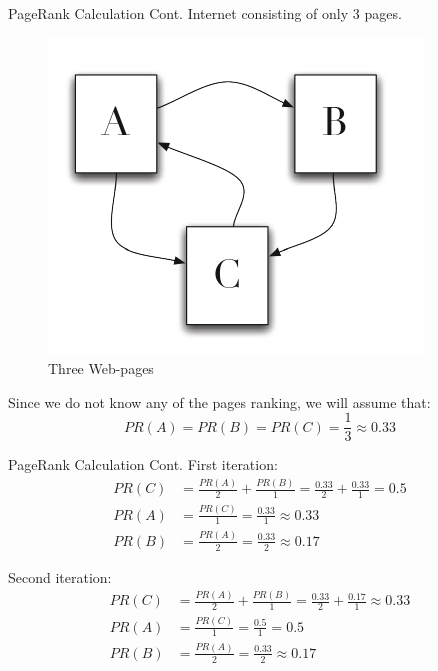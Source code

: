 \documentclass[10pt]{beamer}
\begin{document}
{
\begin{frame}{PageRank Calculation Cont.}
    Internet consisting of only 3 pages. 
  \begin{figure}
		\includegraphics[scale=0.5]{images/Figure1.pdf}
        \caption{Three Web-pages}\label{fig:three-pages}
   \end{figure}
  Since we do not know any of the pages ranking, we will assume that:  
	\begin{equation*}
    	PR(A) = PR(B) = PR(C) = \frac{1}{3} \approx 0.33
	\end{equation*}
\end{frame}

\begin{frame}{PageRank Calculation Cont.}
First iteration:
 	\begin{align*}
    		PR(C) &=\frac{PR(A)}{2}  + \frac{PR(B)}{1}  = \frac{0.33}{2} + \frac{0.33}{1} = 0.5\\
            PR(A) &=\frac{PR(C)}{1}  = \frac{0.33}{1} \approx 0.33\\
            PR(B) &=\frac{PR(A)}{2}  = \frac{0.33}{2} \approx 0.17
	\end{align*}
    
Second iteration:
 	\begin{align*}
    		PR(C) &=\frac{PR(A)}{2}  + \frac{PR(B)}{1}  = \frac{0.33}{2} + \frac{0.17}{1} \approx 0.33\\
            PR(A) &=\frac{PR(C)}{1}  = \frac{0.5}{1} = 0.5\\
            PR(B) &=\frac{PR(A)}{2}  = \frac{0.33}{2} \approx 0.17
	\end{align*}
\end{frame}
}  
\end{document}
